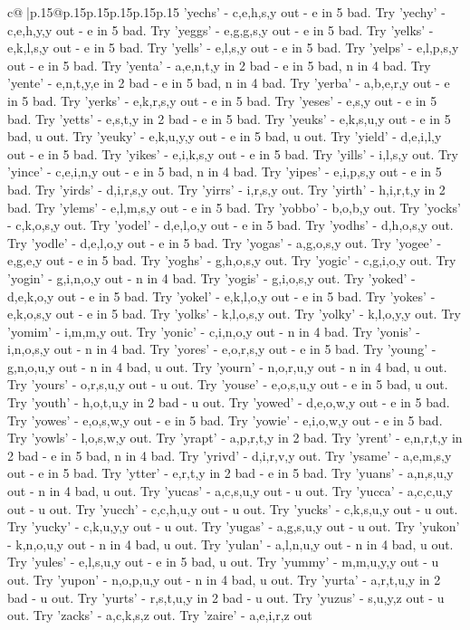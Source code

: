 \documentclass{article}
\begin{document}
{\begin{supertabular}{c@{$\;$}|p{.15\linewidth}@{}p{.15\linewidth}p{.15\linewidth}p{.15\linewidth}p{.15\linewidth}p{.15\linewidth}}
{{{'yechs' {-} c,e,h,s,y out {-} e in 5 bad. Try 'yechy' {-} c,e,h,y,y out {-} e in 5 bad. Try 'yeggs' {-} e,g,g,s,y out {-} e in 5 bad. Try 'yelks' {-} e,k,l,s,y out {-} e in 5 bad. Try 'yells' {-} e,l,s,y out {-} e in 5 bad. Try 'yelps' {-} e,l,p,s,y out {-} e in 5 bad. Try 'yenta' {-} a,e,n,t,y in 2 bad {-} e in 5 bad, n in 4 bad. Try 'yente' {-} e,n,t,y,e in 2 bad {-} e in 5 bad, n in 4 bad. Try 'yerba' {-} a,b,e,r,y out {-} e in 5 bad. Try 'yerks' {-} e,k,r,s,y out {-} e in 5 bad. Try 'yeses' {-} e,s,y out {-} e in 5 bad. Try 'yetts' {-} e,s,t,y in 2 bad {-} e in 5 bad. Try 'yeuks' {-} e,k,s,u,y out {-} e in 5 bad, u out. Try 'yeuky' {-} e,k,u,y,y out {-} e in 5 bad, u out. Try 'yield' {-} d,e,i,l,y out {-} e in 5 bad. Try 'yikes' {-} e,i,k,s,y out {-} e in 5 bad. Try 'yills' {-} i,l,s,y out. Try 'yince' {-} c,e,i,n,y out {-} e in 5 bad, n in 4 bad. Try 'yipes' {-} e,i,p,s,y out {-} e in 5 bad. Try 'yirds' {-} d,i,r,s,y out. Try 'yirrs' {-} i,r,s,y out. Try 'yirth' {-} h,i,r,t,y in 2 bad. Try 'ylems' {-} e,l,m,s,y out {-} e in 5 bad. Try 'yobbo' {-} b,o,b,y out. Try 'yocks' {-} c,k,o,s,y out. Try 'yodel' {-} d,e,l,o,y out {-} e in 5 bad. Try 'yodhs' {-} d,h,o,s,y out. Try 'yodle' {-} d,e,l,o,y out {-} e in 5 bad. Try 'yogas' {-} a,g,o,s,y out. Try 'yogee' {-} e,g,e,y out {-} e in 5 bad. Try 'yoghs' {-} g,h,o,s,y out. Try 'yogic' {-} c,g,i,o,y out. Try 'yogin' {-} g,i,n,o,y out {-} n in 4 bad. Try 'yogis' {-} g,i,o,s,y out. Try 'yoked' {-} d,e,k,o,y out {-} e in 5 bad. Try 'yokel' {-} e,k,l,o,y out {-} e in 5 bad. Try 'yokes' {-} e,k,o,s,y out {-} e in 5 bad. Try 'yolks' {-} k,l,o,s,y out. Try 'yolky' {-} k,l,o,y,y out. Try 'yomim' {-} i,m,m,y out. Try 'yonic' {-} c,i,n,o,y out {-} n in 4 bad. Try 'yonis' {-} i,n,o,s,y out {-} n in 4 bad. Try 'yores' {-} e,o,r,s,y out {-} e in 5 bad. Try 'young' {-} g,n,o,u,y out {-} n in 4 bad, u out. Try 'yourn' {-} n,o,r,u,y out {-} n in 4 bad, u out. Try 'yours' {-} o,r,s,u,y out {-} u out. Try 'youse' {-} e,o,s,u,y out {-} e in 5 bad, u out. Try 'youth' {-} h,o,t,u,y in 2 bad {-} u out. Try 'yowed' {-} d,e,o,w,y out {-} e in 5 bad. Try 'yowes' {-} e,o,s,w,y out {-} e in 5 bad. Try 'yowie' {-} e,i,o,w,y out {-} e in 5 bad. Try 'yowls' {-} l,o,s,w,y out. Try 'yrapt' {-} a,p,r,t,y in 2 bad. Try 'yrent' {-} e,n,r,t,y in 2 bad {-} e in 5 bad, n in 4 bad. Try 'yrivd' {-} d,i,r,v,y out. Try 'ysame' {-} a,e,m,s,y out {-} e in 5 bad. Try 'ytter' {-} e,r,t,y in 2 bad {-} e in 5 bad. Try 'yuans' {-} a,n,s,u,y out {-} n in 4 bad, u out. Try 'yucas' {-} a,c,s,u,y out {-} u out. Try 'yucca' {-} a,c,c,u,y out {-} u out. Try 'yucch' {-} c,c,h,u,y out {-} u out. Try 'yucks' {-} c,k,s,u,y out {-} u out. Try 'yucky' {-} c,k,u,y,y out {-} u out. Try 'yugas' {-} a,g,s,u,y out {-} u out. Try 'yukon' {-} k,n,o,u,y out {-} n in 4 bad, u out. Try 'yulan' {-} a,l,n,u,y out {-} n in 4 bad, u out. Try 'yules' {-} e,l,s,u,y out {-} e in 5 bad, u out. Try 'yummy' {-} m,m,u,y,y out {-} u out. Try 'yupon' {-} n,o,p,u,y out {-} n in 4 bad, u out. Try 'yurta' {-} a,r,t,u,y in 2 bad {-} u out. Try 'yurts' {-} r,s,t,u,y in 2 bad {-} u out. Try 'yuzus' {-} s,u,y,z out {-} u out. Try 'zacks' {-} a,c,k,s,z out. Try 'zaire' {-} a,e,i,r,z out }}}
\end{supertabular}}
\end{document}

